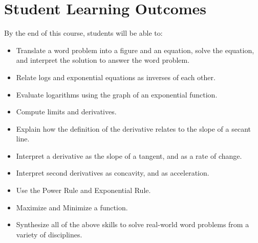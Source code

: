 \documentclass[11pt,letterpaper]{article}
\begin{document}
\section*{Student Learning Outcomes}
By the end of this course, students will be able to:
\begin{itemize}[nosep, label={--}]
\item Translate a word problem into a figure and an equation, solve the equation, and interpret the solution to answer the word problem. 
\item Relate logs and exponential equations as inverses of each other. 
\item Evaluate logarithms using the graph of an exponential function. 
\item Compute limits and derivatives. 
\item Explain how the definition of the derivative relates to the slope of a secant line.
\item Interpret a derivative as the slope of a tangent, and as a rate of change. 
\item Interpret second derivatives as concavity, and as acceleration. 
\item Use the Power Rule and Exponential Rule.
\item Maximize and Minimize a function.
\item Synthesize all of the above skills to solve real-world word problems from a variety of disciplines. 
\end{itemize}
\end{document}
